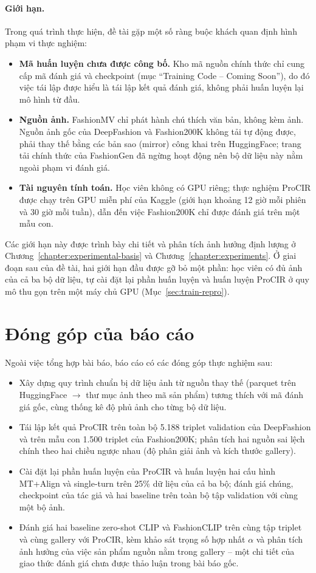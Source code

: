 \paragraph{Giới hạn.} Trong quá trình thực hiện, đề tài gặp một số ràng buộc khách quan định hình phạm vi thực nghiệm:
\begin{itemize}
    \item \textbf{Mã huấn luyện chưa được công bố.} Kho mã nguồn chính thức chỉ cung cấp mã đánh giá và checkpoint (mục ``Training Code -- Coming Soon''), do đó việc tái lập được hiểu là tái lập kết quả đánh giá, không phải huấn luyện lại mô hình từ đầu.
    \item \textbf{Nguồn ảnh.} FashionMV chỉ phát hành chú thích văn bản, không kèm ảnh. Nguồn ảnh gốc của DeepFashion và Fashion200K không tải tự động được, phải thay thế bằng các bản sao (mirror) công khai trên HuggingFace; trang tải chính thức của FashionGen đã ngừng hoạt động nên bộ dữ liệu này nằm ngoài phạm vi đánh giá.
    \item \textbf{Tài nguyên tính toán.} Học viên không có GPU riêng; thực nghiệm ProCIR được chạy trên GPU miễn phí của Kaggle (giới hạn khoảng 12 giờ mỗi phiên và 30 giờ mỗi tuần), dẫn đến việc Fashion200K chỉ được đánh giá trên một mẫu con.
\end{itemize}
Các giới hạn này được trình bày chi tiết và phân tích ảnh hưởng định lượng ở Chương~\ref{chapter:experimental-basis} và Chương~\ref{chapter:experiments}. Ở giai đoạn sau của đề tài, hai giới hạn đầu được gỡ bỏ một phần: học viên có đủ ảnh của cả ba bộ dữ liệu, tự cài đặt lại phần huấn luyện và huấn luyện ProCIR ở quy mô thu gọn trên một máy chủ GPU (Mục~\ref{sec:train-repro}).

\section{Đóng góp của báo cáo}

Ngoài việc tổng hợp bài báo, báo cáo có các đóng góp thực nghiệm sau:
\begin{itemize}
    \item Xây dựng quy trình chuẩn bị dữ liệu ảnh từ nguồn thay thế (parquet trên HuggingFace $\to$ thư mục ảnh theo mã sản phẩm) tương thích với mã đánh giá gốc, cùng thống kê độ phủ ảnh cho từng bộ dữ liệu.
    \item Tái lập kết quả ProCIR trên toàn bộ 5.188 triplet validation của DeepFashion và trên mẫu con 1.500 triplet của Fashion200K; phân tích hai nguồn sai lệch chính theo hai chiều ngược nhau (độ phân giải ảnh và kích thước gallery).
    \item Cài đặt lại phần huấn luyện của ProCIR và huấn luyện hai cấu hình MT+Align và single-turn trên 25\% dữ liệu của cả ba bộ; đánh giá chúng, checkpoint của tác giả và hai baseline trên toàn bộ tập validation với cùng một bộ ảnh.
    \item Đánh giá hai baseline zero-shot CLIP và FashionCLIP trên cùng tập triplet và cùng gallery với ProCIR, kèm khảo sát trọng số hợp nhất $\alpha$ và phân tích ảnh hưởng của việc sản phẩm nguồn nằm trong gallery -- một chi tiết của giao thức đánh giá chưa được thảo luận trong bài báo gốc.
\end{itemize}

